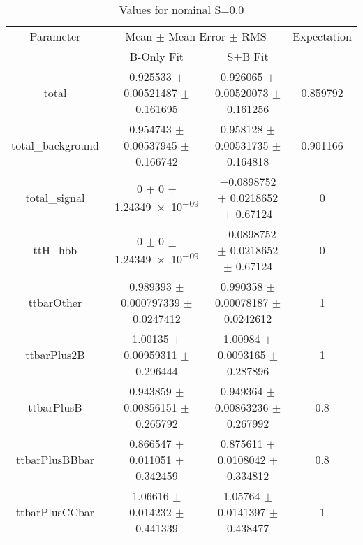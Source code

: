 \begin{table}
\centering
\caption{Values for nominal S=0.0}
\begin{tabular}{cccc}
\toprule
Parameter & \multicolumn{2}{c}{Mean $\pm$ Mean Error $\pm$ RMS} & Expectation\\
 & B-Only Fit & S+B Fit & \\
\midrule
total & \num{0.925533} $\pm$ \num{0.00521487} $\pm$ \num{0.161695} & \num{0.926065} $\pm$ \num{0.00520073} $\pm$ \num{0.161256} & \num{0.859792}\\
total\_background & \num{0.954743} $\pm$ \num{0.00537945} $\pm$ \num{0.166742} & \num{0.958128} $\pm$ \num{0.00531735} $\pm$ \num{0.164818} & \num{0.901166}\\
total\_signal & \num{0} $\pm$ \num{0} $\pm$ \num{1.24349e-09} & \num{-0.0898752} $\pm$ \num{0.0218652} $\pm$ \num{0.67124} & \num{0}\\
ttH\_hbb & \num{0} $\pm$ \num{0} $\pm$ \num{1.24349e-09} & \num{-0.0898752} $\pm$ \num{0.0218652} $\pm$ \num{0.67124} & \num{0}\\
ttbarOther & \num{0.989393} $\pm$ \num{0.000797339} $\pm$ \num{0.0247412} & \num{0.990358} $\pm$ \num{0.00078187} $\pm$ \num{0.0242612} & \num{1}\\
ttbarPlus2B & \num{1.00135} $\pm$ \num{0.00959311} $\pm$ \num{0.296444} & \num{1.00984} $\pm$ \num{0.0093165} $\pm$ \num{0.287896} & \num{1}\\
ttbarPlusB & \num{0.943859} $\pm$ \num{0.00856151} $\pm$ \num{0.265792} & \num{0.949364} $\pm$ \num{0.00863236} $\pm$ \num{0.267992} & \num{0.8}\\
ttbarPlusBBbar & \num{0.866547} $\pm$ \num{0.011051} $\pm$ \num{0.342459} & \num{0.875611} $\pm$ \num{0.0108042} $\pm$ \num{0.334812} & \num{0.8}\\
ttbarPlusCCbar & \num{1.06616} $\pm$ \num{0.014232} $\pm$ \num{0.441339} & \num{1.05764} $\pm$ \num{0.0141397} $\pm$ \num{0.438477} & \num{1}\\
\bottomrule
\end{tabular}
\end{table}